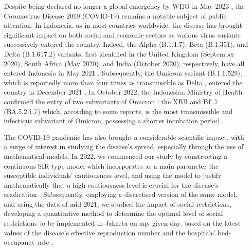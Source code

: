 \documentclass[11pt,reqno]{amsart}
\begin{document}
Despite being declared no longer a global emergency by WHO in May 2023 \cite{WHO}, the Coronavirus Disease 2019 (COVID-19) remains a notable subject of public attention. In Indonesia, as in most countries worldwide, the disease has brought significant impact on both social and economic sectors \cite{OliviaGibsonNasrudin,SuryahadiIzzatiSuryadarma,SusilawatiFalefiPurwoko} as various virus variants successively entered the country. Indeed, the Alpha (B.1.1.7), Beta (B.1.351), and Delta (B.1.617.2) variants, first identified in the United Kingdom (September 2020), South Africa (May 2020), and India (October 2020), respectively, have all entered Indonesia in May 2021 \cite{MargariniAnindita}. Subsequently, the Omicron variant (B.1.1.529), which is reportedly more than four times as transmissible as Delta \cite{Matsumaya}, entered the country in December 2021 \cite{Wahyuni}. In October 2022, the Indonesian Ministry of Health confirmed the entry of two subvariants of Omicron \cite{Fernandez}: the XBB and BF.7 (BA.5.2.1.7) which, according to some reports, is the most transmissible and infectious subvariant of Omicron, possessing a shorter incubation period \cite{Mohammed,SinghAnandSrivastava}.

The COVID-19 pandemic has also brought a considerable scientific impact, with a surge of interest in studying the disease's spread, especially through the use of mathematical models. In 2022, we commenced our study by constructing a continuous SIR-type model which incorporates as a main parameter the susceptible individuals' cautiousness level, and using the model to justify mathematically that a high cautiousness level is crucial for the disease's eradication \cite{YongOwenHoseana}. %
Subsequently, employing a discretised version of the same model, and using the data of mid 2021, we studied the impact of social restrictions, developing a quantitative method to determine the optimal level of social restrictions to be implemented in Jakarta on any given day, based on the latest values of the disease's effective reproduction number and the hospitals' bed-occupancy rate \cite{YongHoseanaOwen1}.

\end{document}
